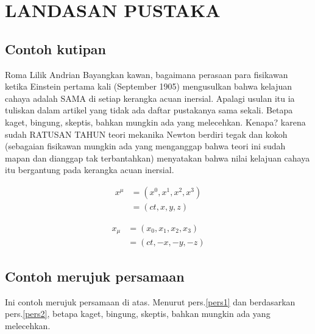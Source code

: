 \chapter{LANDASAN PUSTAKA}

\section{Contoh kutipan}
Roma Lilik Andrian Bayangkan kawan, bagaimana perasaan para fisikawan ketika Einstein pertama kali (September 1905) mengusulkan bahwa kelajuan  cahaya adalah SAMA di setiap kerangka acuan inersial. Apalagi usulan itu ia tuliskan dalam artikel yang tidak ada daftar pustakanya sama sekali. Betapa kaget, bingung, skeptis, bahkan mungkin ada yang melecehkan. Kenapa? karena sudah RATUSAN TAHUN teori mekanika Newton berdiri tegak dan kokoh (sebagaian fisikawan mungkin ada yang menganggap bahwa teori ini sudah mapan dan dianggap tak terbantahkan) menyatakan bahwa nilai kelajuan cahaya itu bergantung pada kerangka acuan inersial\cite{arikunto2002}. 

\begin{equation}
\label{pers1}
\begin{split}
x^\mu & = (x^0,x^1,x^2,x^3 )\\ 
& = ( ct,x,y,z )
\end{split}
\end{equation}

\begin{equation}
\label{pers2}
\begin{split}
x_\mu & = (x_0,x_1,x_2,x_3 )\\
& = ( ct,-x,-y,-z )
\end{split}
\end{equation}

\section{Contoh merujuk persamaan}

Ini contoh merujuk persamaan di atas. Menurut pers.\eqref{pers1} dan berdasarkan pers.\eqref{pers2}, betapa kaget, bingung, skeptis, bahkan mungkin ada yang melecehkan.
